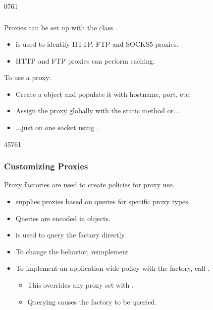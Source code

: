 \begin{slide}{0761}
\frametitle{}\label{QNetworkProxy}
Proxies can be set up with the class .
\begin{itemize}
\item {} is used to identify HTTP, FTP and SOCKS5 proxies.
\item HTTP and FTP proxies can perform caching.
\end{itemize}
To use a proxy:
\begin{itemize}
\item Create a  object
and populate it with hostname, port, etc.
\item Assign the proxy globally with the static method
 or...
\item ...just on one socket using .
\end{itemize}
\end{slide}

\begin{slide}{45761}
\frametitle{Customizing Proxies}
Proxy factories are used to create policies for proxy use.
\begin{itemize}
  \item {} supplies proxies based on queries for
  specific proxy types.
  \item Queries are encoded in  objects.
  \item {} is used to query the factory
  directly. 
  \item To change the behavior, reimplement
  .
  \item To implement an application-wide policy with the factory, call
  .
  \begin{itemize}
    \item This overrides any proxy set with
          .
    \item Querying  causes the
          factory to be queried.
  \end{itemize}
\end{itemize}
\end{slide}

